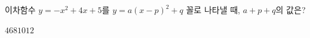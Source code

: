 이차함수 $y=-x^2+4x+5$를 $y=a(x-p)^2+q$ 꼴로 나타낼 때, $a+p+q$의 값은? 
\begin{choices32}{$4$}{$6$}{$8$}{$10$}{$12$}\end{choices32}
